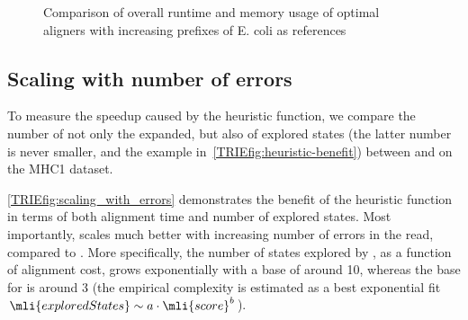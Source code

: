 \begin{figure}[H]
  \centering
  \caption[Performance scaling with reference size]{Comparison of overall
     runtime and memory usage of optimal aligners with increasing prefixes of E.
     coli as references}
  \label{TRIEfig:scaling_with_graphsize}
\end{figure}

\subsection{Scaling with number of errors}
To measure the speedup caused by the heuristic function, we compare the number
of not only the expanded, but also of explored states (the latter number is
never smaller, and the example in~\cref{TRIEfig:heuristic-benefit}) between
\astarix and \dijkstra on the MHC1 dataset.

\cref{TRIEfig:scaling_with_errors} demonstrates the benefit of the heuristic
function in terms of both alignment time and number of explored states. Most
importantly, \astarix scales much better with increasing number of errors in the
read, compared to \dijkstra. More specifically, the number of states explored by
\dijkstra, as a function of alignment cost, grows exponentially with a base of 
around 10, whereas the base for \astarix is around 3 (the empirical complexity is
estimated as a best exponential fit \mbox{$\mli{exploredStates} \sim a \cdot
\mli{score}^b$}).

